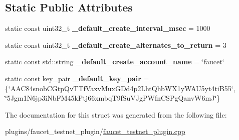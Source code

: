 \subsection*{Static Public Attributes}
\begin{DoxyCompactItemize}
\item 
\mbox{\label{structaacio_1_1faucet__testnet__plugin__impl_a29ea67f168cf8ef6c484e9c1e0e2e756}} 
static const uint32\+\_\+t {\bfseries \+\_\+default\+\_\+create\+\_\+interval\+\_\+msec} = 1000
\item 
\mbox{\label{structaacio_1_1faucet__testnet__plugin__impl_acec153e162a822d38b80657fe501a16d}} 
static const uint32\+\_\+t {\bfseries \+\_\+default\+\_\+create\+\_\+alternates\+\_\+to\+\_\+return} = 3
\item 
\mbox{\label{structaacio_1_1faucet__testnet__plugin__impl_a98a188255e424ab7bb1b646fc9f29bde}} 
static const std\+::string {\bfseries \+\_\+default\+\_\+create\+\_\+account\+\_\+name} = \char`\"{}faucet\char`\"{}
\item 
\mbox{\label{structaacio_1_1faucet__testnet__plugin__impl_aebc2bb739a93803d4bc8f9120f817e49}} 
static const key\+\_\+pair {\bfseries \+\_\+default\+\_\+key\+\_\+pair} = \{\char`\"{}A\+A\+C84snob\+C\+Gtp\+Qv\+T\+Tf\+Vaxv\+Mux\+G\+Dd4p2\+Lht\+Qhb\+W\+X1y\+W\+A\+U5yt4ti\+B55\char`\"{}, \char`\"{}5\+Jgm1\+N6jp3i\+Nb\+F\+M45k\+Ptj66xmbq\+T9f\+Su\+V\+Jg\+P\+Wfn\+C\+S\+Pg\+Qanv\+W6m\+J\char`\"{}\}
\end{DoxyCompactItemize}


The documentation for this struct was generated from the following file\+:\begin{DoxyCompactItemize}
\item 
plugins/faucet\+\_\+testnet\+\_\+plugin/\mbox{\hyperlink{faucet__testnet__plugin_8cpp}{faucet\+\_\+testnet\+\_\+plugin.\+cpp}}\end{DoxyCompactItemize}

